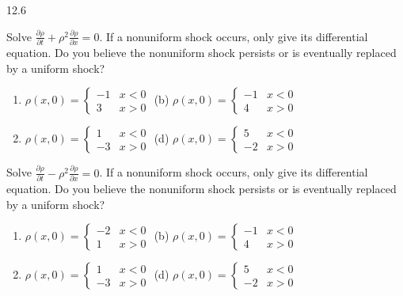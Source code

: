\begin{exercises}{12.6}
\item \label{ex:12.6.22}
Solve $\frac{\partial\rho}{\partial t} + \rho^2\frac{\partial\rho}{\partial x} = 0$.  If a nonuniform shock occurs, only give its differential equation.  Do you believe the nonuniform shock persists or is eventually replaced by a uniform shock?
\begin{enumerate}
\item[(a)] $\rho(x,0) = \begin{cases} -1 & x < 0 \\ 3 & x > 0 \end{cases}$ \hfill (b) $\rho(x,0) = \begin{cases} -1 & x < 0 \\ 4 & x > 0 \end{cases}$

\item[(c)] $\rho(x,0) = \begin{cases} 1 & x < 0 \\ -3 & x > 0 \end{cases}$ \hfill (d) $\rho(x,0) = \begin{cases} 5 & x < 0 \\ -2 & x > 0 \end{cases}$
\end{enumerate}

\item \label{ex:12.6.23}
Solve $\frac{\partial\rho}{\partial t} - \rho^2\frac{\partial\rho}{\partial x} = 0$.  If a nonuniform shock occurs, only give its differential equation.  Do you believe the nonuniform shock persists or is eventually replaced by a uniform shock?
\begin{enumerate}
\item[(a)] $\rho(x,0) = \begin{cases} -2 & x < 0 \\ 1 & x > 0 \end{cases}$ \hfill (b) $\rho(x,0) = \begin{cases} -1 & x < 0 \\ 4 & x > 0 \end{cases}$

\item[(c)] $\rho(x,0) = \begin{cases} 1 & x < 0 \\ -3 & x > 0 \end{cases}$ \hfill (d) $\rho(x,0) = \begin{cases} 5 & x < 0 \\ -2 & x > 0 \end{cases}$
\end{enumerate}

\end{exercises}
